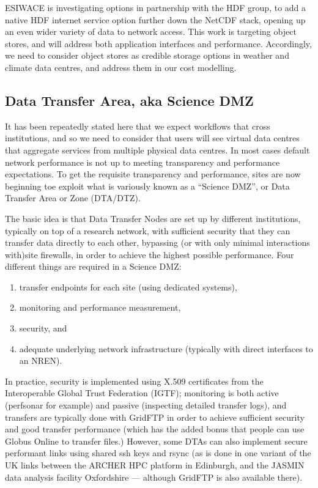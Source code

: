 ESIWACE is investigating options in partnership with the HDF group, to
add a native HDF internet service option further down the NetCDF stack,
opening up an even wider variety of data to network access. This work
is targeting object stores, and will address both application
interfaces and performance. Accordingly, we need to consider object
stores as credible storage options in weather and climate data centres,
and address them in our cost modelling.

\subsection{Data Transfer Area, aka Science DMZ}
\label{sec:dmz}

It has been repeatedly stated here that we expect workflows that cross
institutions, and so we need to consider that users will see virtual data
centres that aggregate services from multiple physical data centres. In most
cases default network performance is not up to meeting transparency and
performance expectations. To get the requisite transparency and performance,
sites are now beginning toe exploit what is variously known as a ``Science
DMZ'', or Data Transfer Area or Zone (DTA/DTZ).

The basic idea is that Data Transfer Nodes are set up by different institutions,
typically on top of a research network, with sufficient security that they can
transfer data directly to each other, bypassing (or with only minimal interactions with)site firewalls, in order to achieve the highest
possible performance. Four different things are required in a Science DMZ:
\begin{enumerate}
    \item transfer endpoints for each site (using dedicated systems),
    \item  monitoring and performance measurement,
    \item security, and
    \item adequate underlying network infrastructure (typically with
    direct interfaces to an NREN).
\end{enumerate}
In practice, security is implemented using X.509 certificates from
the Interoperable Global Trust Federation (IGTF);  monitoring is both active
(perfsonar for example) and passive (inspecting detailed transfer logs), and
transfers are typically done with GridFTP in order to achieve sufficient
security and good transfer performance (which has the added bonus that people can
use Globus Online to transfer files.)   However, some DTAs can also implement
secure performant links using shared ssh keys and rsync (as is done in one variant of the UK links between the ARCHER HPC platform in Edinburgh, and the JASMIN data analysis facility Oxfordshire  --- although GridFTP is also available there).
